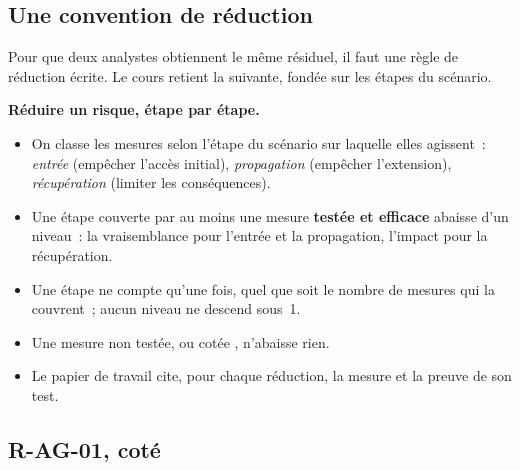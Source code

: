 \subsection{Une convention de réduction}

Pour que deux analystes obtiennent le même résiduel, il faut une règle de
réduction écrite. Le cours retient la suivante, fondée sur les étapes du
scénario.

\begin{boxprocedure}
\textbf{Réduire un risque, étape par étape.}
\begin{itemize}
    \item On classe les mesures selon l'étape du scénario sur laquelle
          elles agissent~: \emph{entrée} (empêcher l'accès initial),
          \emph{propagation} (empêcher l'extension), \emph{récupération}
          (limiter les conséquences).
    \item Une étape couverte par au moins une mesure \textbf{testée et
          efficace} abaisse d'un niveau~: la vraisemblance pour l'entrée et
          la propagation, l'impact pour la récupération.
    \item Une étape ne compte qu'une fois, quel que soit le nombre de
          mesures qui la couvrent~; aucun niveau ne descend sous~1.
    \item Une mesure non testée, ou cotée \NEK{}, n'abaisse rien.
    \item Le papier de travail cite, pour chaque réduction, la mesure et la
          preuve de son test.
\end{itemize}
\end{boxprocedure}

\subsection{R-AG-01, coté}

